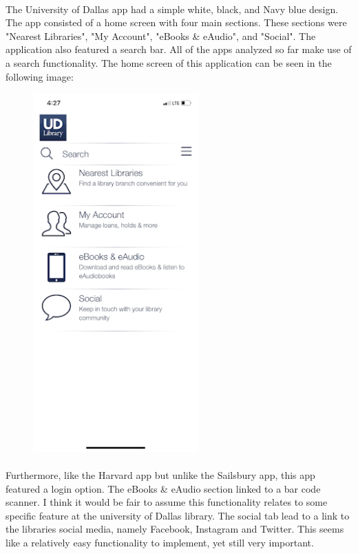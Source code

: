             \paragraph{}
            The University of Dallas app had a simple white, black, and Navy blue design. The app consisted of a home screen with four main sections. These sections were "Nearest Libraries", "My Account", "eBooks & eAudio", and "Social". The application also featured a search bar. All of the apps analyzed so far make use of a search functionality. The home screen of this application can be seen in the following image: 
            \begin{figure}[htbp]
            \centerline{\includegraphics[width=2.5in]{unnamed-2.png}}
            \end{figure}
            \paragraph{}
            \paragraph{}
            Furthermore, like the Harvard app but unlike the Sailsbury app, this app featured a login option. The eBooks & eAudio section linked to a bar code scanner. I think it would be fair to assume this functionality relates to some specific feature at the university of Dallas library. The social tab lead to a link to the libraries social media, namely Facebook, Instagram and Twitter. This seems like a relatively easy functionality to implement, yet still very important. 

